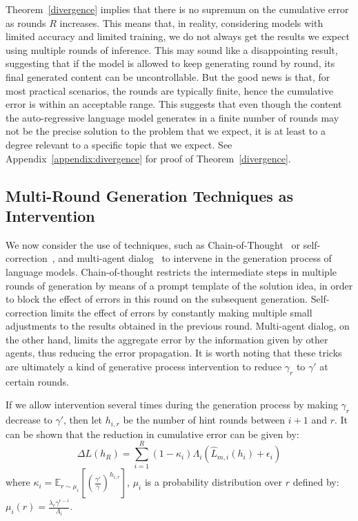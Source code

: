 Theorem~\ref{divergence} implies that there is no supremum on the cumulative error as rounds \(R\) increases. This means that, in reality, considering models with limited accuracy and limited training, we do not always get the results we expect using multiple rounds of inference. This may sound like a disappointing result, suggesting that if the model is allowed to keep generating round by round, its final generated content can be uncontrollable. But the good news is that, for most practical scenarios, the rounds are typically finite, hence the cumulative error is within an acceptable range. This suggests that even though the content the auto-regressive language model generates in a finite number of rounds may not be the precise solution to the problem that we expect, it is at least to a degree relevant to a specific topic that we expect. See Appendix~\ref{appendix:divergence} for proof of Theorem~\ref{divergence}.

\subsection{Multi-Round Generation Techniques as Intervention}

We now consider the use of techniques, such as Chain-of-Thought~\citep{wei2022chain} or self-correction~\citep{madaan2023selfrefine}, and multi-agent dialog~\citep{pmlr-v235-khan24a} to intervene in the generation process of language models. Chain-of-thought restricts the intermediate steps in multiple rounds of generation by means of a prompt template of the solution idea, in order to block the effect of errors in this round on the subsequent generation. Self-correction limits the effect of errors by constantly making multiple small adjustments to the results obtained in the previous round. Multi-agent dialog, on the other hand, limits the aggregate error by the information given by other agents, thus reducing the error propagation. It is worth noting that these tricks are ultimately a kind of generative process intervention to reduce \(\gamma_r\) to \(\gamma'\) at certain rounds.

\begin{theorem}\label{intervention} If we allow intervention several times during the generation process by making \(\gamma_r\) decrease to \(\gamma'\), then let \( h_{i,r}\) be the number of hint rounds between \( i+1 \) and \( r \). It can be shown that
    the reduction in cumulative error can be given by:
  \[
  \Delta L(h_R) = \sum_{i=1}^{R} \left( 1 - \kappa_i \right) \Lambda_i \left( \hat{L}_{m,i}(h_i) + \epsilon_i \right)
  \]
 where \(\kappa_i =  \mathbb{E}_{r \sim \mu_i} \left[ \left( \frac{\gamma'}{\gamma} \right)^{h_{i,r}} \right] \), \( \mu_i \) is a probability distribution over \( r \) defined by: \(\mu_i(r) = \frac{\lambda_r \gamma^{r - i}}{\Lambda_i}\).
\end{theorem}

